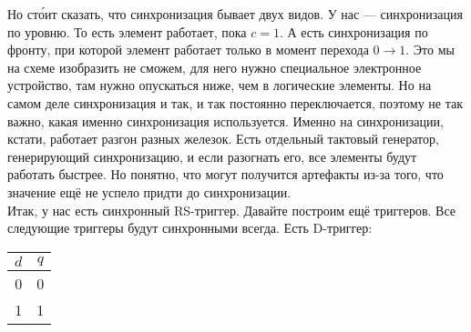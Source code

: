 \documentclass{article}
\begin{document}
    \begin{center}\end{center}
    Но ст\'{о}ит сказать, что синхронизация бывает двух видов. У нас --- синхронизация по уровню. То есть элемент работает, пока $c=1$. А есть синхронизация по фронту, при которой элемент работает только в момент перехода $0\to1$. Это мы на схеме изобразить не сможем, для него нужно специальное электронное устройство, там нужно опускаться ниже, чем в логические элементы. Но на самом деле синхронизация и так, и так постоянно переключается, поэтому не так важно, какая именно синхронизация используется. Именно на синхронизации, кстати, работает разгон разных железок. Есть отдельный тактовый генератор, генерирующий синхронизацию, и если разогнать его, все элементы будут работать быстрее. Но понятно, что могут получится артефакты из-за того, что значение ещё не успело придти до синхронизации.\\
    Итак, у нас есть синхронный RS-триггер. Давайте построим ещё триггеров. Все следующие триггеры будут синхронными всегда. Есть D-триггер:\\
    \begin{tabular}{c|c}
        $d$ & $q$\\
        \hline
        0 & 0\\
        1 & 1\\
    \end{tabular}\\
\end{document}
